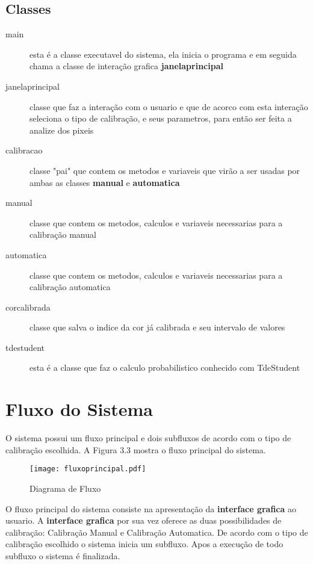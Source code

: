 \subsection{Classes}
	\begin{description}

	\item [main] esta é a classe executavel do sistema, ela inicia o programa e em seguida chama a classe de interação grafica \textbf{janelaprincipal}  
	
	\item [janelaprincipal]	classe que faz a interação com o usuario e que de acorco com esta interação seleciona o tipo de calibração, e seus parametros, para então ser feita a analize dos pixeis	
		
	\item [calibracao] classe "pai" que contem os metodos e variaveis que virão a ser usadas por ambas as classes \textbf{manual} e \textbf{automatica}
	
	\item [manual] classe que contem os metodos, calculos e variaveis necessarias para a calibração manual
	
	\item [automatica] classe que contem os metodos, calculos e variaveis necessarias para a calibração automatica
			
	\item [corcalibrada] classe que salva o indice da cor já calibrada e seu intervalo de valores
	
	\item [tdestudent] esta é a classe que faz o calculo probabilistico conhecido com TdeStudent
	

	\end{description}

	

	\section{Fluxo do Sistema}
O sistema possui um fluxo principal e dois subfluxos de acordo com o tipo de calibração escolhida. A Figura 3.3 mostra o fluxo principal do sistema.
		\begin{figure}[!h]
			\centering
			\texttt{[image: fluxoprincipal.pdf]}
			\caption{Diagrama de Fluxo}
			\label{FlowCHart}
		\end{figure} 
		
		 O fluxo principal do sistema consiste na apresentação da \textbf{interface grafica} ao usuario. A \textbf{interface grafica} por sua vez oferece as duas possibilidades de calibração: Calibração Manual e Calibração Automatica. De acordo com o tipo de calibração escolhido o sistema inicia um subfluxo. Apos a execução de todo subfluxo o sistema é finalizada.
			
